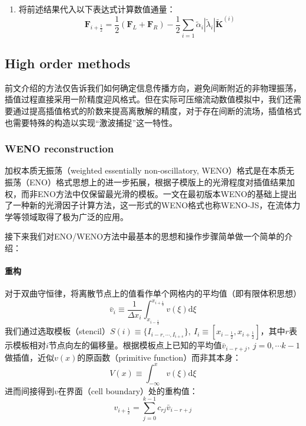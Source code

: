 \documentclass[11pt]{article}
\begin{document}
\begin{enumerate}
\begin{equation}
\begin{array}{l}
			      \alpha_1=\frac{1}{2a^2}\left(\Delta p-\rho a\Delta u\right) \\
			      \alpha_2=\Delta\rho-\Delta p/a^2                            \\
			      \alpha_3=\frac{1}{2a^2}\left(\Delta p+\rho a\Delta u\right)
		      \end{array}\right\}
	      \end{equation}
	      其中$\Delta f\equiv f_R-f_L$。
	\item 将前述结果代入以下表达式计算数值通量：
	      \begin{equation}
		      \bm{F}_{i+\frac{1}{2}}=\frac{1}{2}\left(\bm{F}_L+\bm{F}_R\right)-\frac{1}{2}\sum_{i=1}\tilde{\alpha}_i|\tilde{\lambda}_i|\tilde{\bm{K}}^{(i)}
	      \end{equation}
\end{enumerate}

\subsection{High order methods}
前文介绍的方法仅告诉我们如何确定信息传播方向，避免间断附近的非物理振荡，插值过程直接采用一阶精度迎风格式。但在实际可压缩流动数值模拟中，我们还需要通过提高插值格式的阶数来提高离散解的精度，对于存在间断的流场，插值格式也需要特殊的构造以实现“激波捕捉”这一特性。

\subsubsection{WENO reconstruction}
加权本质无振荡（weighted essentially non-oscillatory, WENO）格式\citep{liu_weighted_1994}是在本质无振荡（ENO）格式思想上的进一步拓展，根据子模版上的光滑程度对插值结果加权，而非ENO方法中仅保留最光滑的模板。\citet{jiang_efficient_1996}一文在最初版本WENO的基础上提出了一种新的光滑因子计算方法，这一形式的WENO格式也称WENO-JS，在流体力学等领域取得了极为广泛的应用。

接下来我们对ENO/WENO方法中最基本的思想和操作步骤简单做一个简单的介绍：
\paragraph{重构} 对于双曲守恒律，将离散节点上的值看作单个网格内的平均值（即有限体积思想）
\begin{equation}
	\bar{v}_i\equiv\frac{1}{\Delta x_i}\int_{x_{i-\frac{1}{2}}}^{x_{i+\frac{1}{2}}}v(\xi)\mathrm{d}\xi
\end{equation}
我们通过选取模板（stencil）$S(i)\equiv\{I_{i-r,\cdots,I_{i+s}}\},\ I_i\equiv\left[x_{i-\frac{1}{2}},x_{i+\frac{1}{2}}\right]$，其中$r$表示模板相对$i$节点向左的偏移量。根据模板点上已知的平均值$\bar{v}_{i-r+j},\ j=0,\cdots k-1$做插值，近似$v(x)$的原函数（primitive function）而非其本身：
\begin{equation}
	V(x)\equiv\int_{-\infty}^x v(\xi)\mathrm{d}\xi
\end{equation}
进而间接得到$v$在界面（cell boundary）处的重构值：
\begin{equation}
	v_{i+\frac{1}{2}}=\sum_{j=0}^{k-1}c_{rj}\bar{v}_{i-r+j}
\end{equation}
\end{document}
